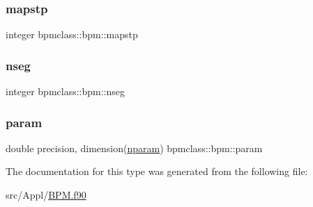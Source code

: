 \mbox{\label{structbpmclass_1_1bpm_a57b5d567476a69c20de780f6fb8d0a2e}} 
\subsubsection{\texorpdfstring{mapstp}{mapstp}}
{\footnotesize\ttfamily integer bpmclass\+::bpm\+::mapstp}

\mbox{\label{structbpmclass_1_1bpm_af47828f23a39ecfbef81048d780c4107}} 
\subsubsection{\texorpdfstring{nseg}{nseg}}
{\footnotesize\ttfamily integer bpmclass\+::bpm\+::nseg}

\mbox{\label{structbpmclass_1_1bpm_ab4cbff356dd68d8a0563cb3b1d4ae235}} 
\subsubsection{\texorpdfstring{param}{param}}
{\footnotesize\ttfamily double precision, dimension(\mbox{\hyperlink{namespacebpmclass_ac2f2f373976236d08c9c68de895950eb}{nparam}}) bpmclass\+::bpm\+::param}



The documentation for this type was generated from the following file\+:\begin{DoxyCompactItemize}
\item 
src/\+Appl/\mbox{\hyperlink{_b_p_m_8f90}{B\+P\+M.\+f90}}\end{DoxyCompactItemize}
